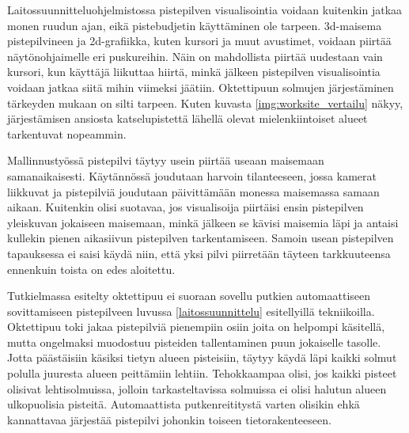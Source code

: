Laitossuunnitteluohjelmistossa pistepilven visualisointia voidaan kuitenkin jatkaa monen ruudun ajan, eikä pistebudjetin käyttäminen ole tarpeen. 3d-maisema pistepilvineen ja 2d-grafiikka, kuten kursori ja muut avustimet, voidaan piirtää näytönohjaimelle eri puskureihin. Näin on mahdollista piirtää uudestaan vain kursori, kun käyttäjä liikuttaa hiirtä, minkä jälkeen pistepilven visualisointia voidaan jatkaa siitä mihin viimeksi jäätiin. Oktettipuun solmujen järjestäminen tärkeyden mukaan on silti tarpeen. Kuten kuvasta \ref{img:worksite_vertailu} näkyy, järjestämisen ansiosta katselupistettä lähellä olevat mielenkiintoiset alueet tarkentuvat nopeammin.

Mallinnustyössä pistepilvi täytyy usein piirtää useaan maisemaan samanaikaisesti. Käytännössä joudutaan harvoin tilanteeseen, jossa kamerat liikkuvat ja pistepilviä joudutaan päivittämään monessa maisemassa samaan aikaan. Kuitenkin olisi suotavaa, jos visualisoija piirtäisi ensin pistepilven yleiskuvan jokaiseen maisemaan, minkä jälkeen se kävisi maisemia läpi ja antaisi kullekin pienen aikasiivun pistepilven tarkentamiseen. Samoin usean pistepilven tapauksessa ei saisi käydä niin, että yksi pilvi piirretään täyteen tarkkuuteensa ennenkuin toista on edes aloitettu. 

Tutkielmassa esitelty oktettipuu ei suoraan sovellu putkien automaattiseen sovittamiseen pistepilveen luvussa \ref{laitossuunnittelu} esitellyillä tekniikoilla. Oktettipuu toki jakaa pistepilviä pienempiin osiin joita on helpompi käsitellä, mutta ongelmaksi muodostuu pisteiden tallentaminen puun jokaiselle tasolle. Jotta päästäisiin käsiksi tietyn alueen pisteisiin, täytyy käydä läpi kaikki solmut polulla juuresta alueen peittämiin lehtiin. Tehokkaampaa olisi, jos kaikki pisteet olisivat lehtisolmuissa, jolloin tarkasteltavissa solmuissa ei olisi halutun alueen ulkopuolisia pisteitä. Automaattista putkenreititystä varten olisikin ehkä kannattavaa järjestää pistepilvi johonkin toiseen tietorakenteeseen.     